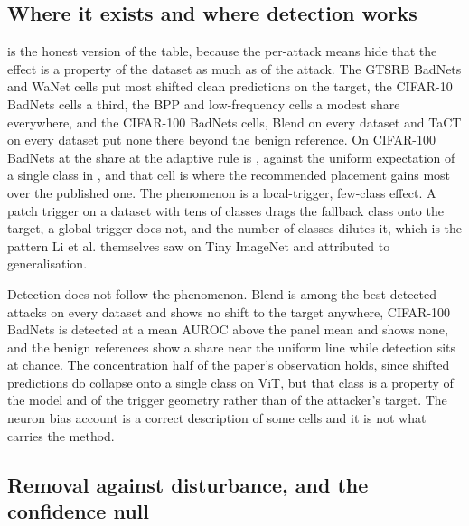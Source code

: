 \documentclass[../main.tex]{subfiles}
\begin{document}
\subsection{Where it exists and where detection works}

 is the honest version of the table, because the per-attack means hide that the effect is a property of the dataset as much as of the attack. The GTSRB BadNets and WaNet cells put most shifted clean predictions on the target, the CIFAR-10 BadNets cells a third, the BPP and low-frequency cells a modest share everywhere, and the CIFAR-100 BadNets cells, Blend on every dataset and TaCT on every dataset put none there beyond the benign reference. On CIFAR-100 BadNets at \PanelRateLow{} the share at the adaptive rule is \ShiftToTargetHeadlineCell{}, against the uniform expectation of a single class in \ClassesCifarOneZeroZero{}, and that cell is where the recommended placement gains most over the published one. The phenomenon is a local-trigger, few-class effect. A patch trigger on a dataset with tens of classes drags the fallback class onto the target, a global trigger does not, and the number of classes dilutes it, which is the pattern Li et al. themselves saw on Tiny ImageNet and attributed to generalisation.



Detection does not follow the phenomenon. Blend is among the best-detected attacks on every dataset and shows no shift to the target anywhere, CIFAR-100 BadNets is detected at a mean AUROC above the panel mean and shows none, and the benign references show a share near the uniform line while detection sits at chance. The concentration half of the paper's observation holds, since shifted predictions do collapse onto a single class on ViT, but that class is a property of the model and of the trigger geometry rather than of the attacker's target. The neuron bias account is a correct description of some cells and it is not what carries the method.

\subsection{Removal against disturbance, and the confidence null}
\end{document}
